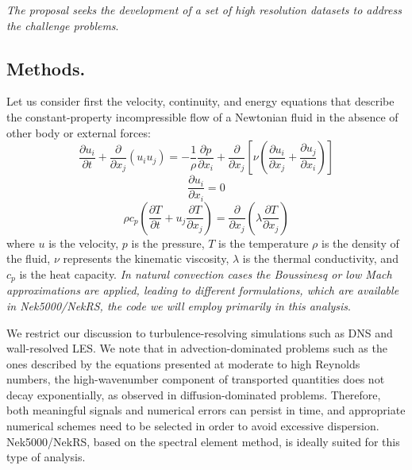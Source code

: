 \documentclass[11pt,letterpaper,english]{article}
\begin{document}
\textit{The proposal seeks the development of a set of high resolution datasets to address the challenge problems}.

\vspace{-.25in}
\subsection{Methods.}
\vspace{-.2in}

Let us consider first  the velocity, continuity, and energy  equations that describe the constant-property incompressible flow of a Newtonian fluid in the absence of other body or external forces:
\begin{equation}
\frac{\partial  u_i  }{\partial t} +  \frac{\partial}{\partial x_j} \left( u_i u_j \right) =-\frac{1}{\rho} \frac{\partial p}{\partial x_i} + \frac{\partial}{\partial x_j} \left[ \nu \left( \frac{\partial u_i}{\partial x_j} +\frac{\partial u_j}{\partial x_i} \right) \right]
\label{UEqn}
\end{equation}
\begin{equation}
\frac{\partial u_i}{\partial x_i} = 0
\label{rhoEqn}
\end{equation}
\begin{equation}
\rho c_p \left( \frac{\partial T }{\partial t} + u_j \frac{\partial T}{\partial x_j} \right) = \frac{\partial }{\partial x_j} \left( \lambda \frac{\partial T}{\partial x_j} \right)
\label{EEqn}
\end{equation}
where $u$ is the velocity, $p$ is the pressure, $T$ is the temperature $\rho$ is the  density of the fluid, $\nu$ represents the kinematic viscosity, $\lambda$ is the thermal conductivity, and $c_p$ is the heat capacity. \textit{In natural convection cases the Boussinesq or low Mach approximations} \cite{tomboulides1997numerical} \textit{are applied, leading to different formulations, which are available in Nek5000/NekRS, the code we will employ primarily in this analysis}.

We restrict our discussion to turbulence-resolving simulations such as DNS and wall-resolved LES. We note that in advection-dominated problems such as the ones described by the equations presented at moderate to high Reynolds numbers, the high-wavenumber component of transported quantities does not decay exponentially, as observed in diffusion-dominated problems. Therefore, both meaningful signals and numerical errors can persist in time, and appropriate numerical schemes need to be selected in order to avoid excessive dispersion. Nek5000/NekRS, based on the spectral element method, is ideally suited for this type of analysis.
\end{document}
